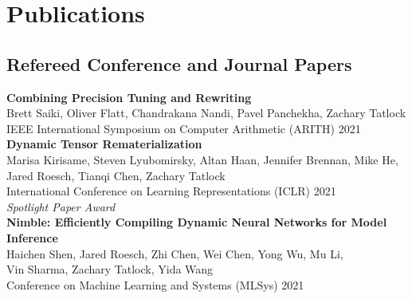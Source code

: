 \documentclass[10pt]{article}
\begin{document}





\section*{Publications}

\subsection*{Refereed Conference and Journal Papers}

\textbf{%
Combining Precision Tuning and Rewriting
} \\
Brett Saiki, Oliver Flatt, Chandrakana Nandi, Pavel Panchekha, Zachary Tatlock \\
IEEE International Symposium on Computer Arithmetic (ARITH) 2021 \\

\textbf{%
Dynamic Tensor Rematerialization
} \\
Marisa Kirisame, Steven Lyubomirsky, Altan Haan, Jennifer Brennan, Mike He, \\
Jared Roesch, Tianqi Chen, Zachary Tatlock \\
International Conference on Learning Representations (ICLR) 2021 \\
\textit{Spotlight Paper Award} \\

\textbf{%
Nimble: Efficiently Compiling Dynamic Neural Networks for Model Inference
} \\
Haichen Shen, Jared Roesch, Zhi Chen, Wei Chen, Yong Wu, Mu Li, \\
Vin Sharma, Zachary Tatlock, Yida Wang \\
Conference on Machine Learning and Systems (MLSys) 2021 \\
\end{document}

